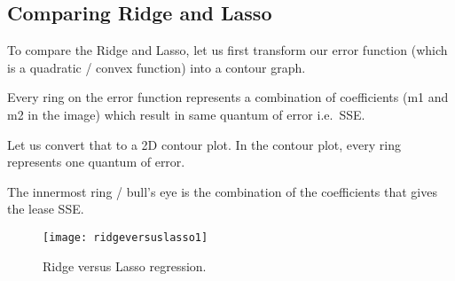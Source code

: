 	\subsection{Comparing Ridge and Lasso}
To compare the Ridge and Lasso, let us first transform our error function (which is a quadratic / convex function) into a contour graph.

	\begin{bulletedlist}
		\item Every ring on the error function represents a combination of coefficients (m1 and m2 in the image) which result in same quantum of error i.e.\ SSE.
		\item Let us convert that to a 2D contour plot.  In the contour plot, every ring represents one quantum of error.
		\item The innermost ring / bull's eye is the combination of the coefficients that gives the lease SSE.
	\end{bulletedlist}

	\begin{figure}[tbh]
		\centering
		\texttt{[image: ridgeversuslasso1]}
		\caption[Ridge versus Lasso regression]{Ridge versus Lasso regression.}
		\label{fig:ridgeversuslasso1}
	\end{figure} 